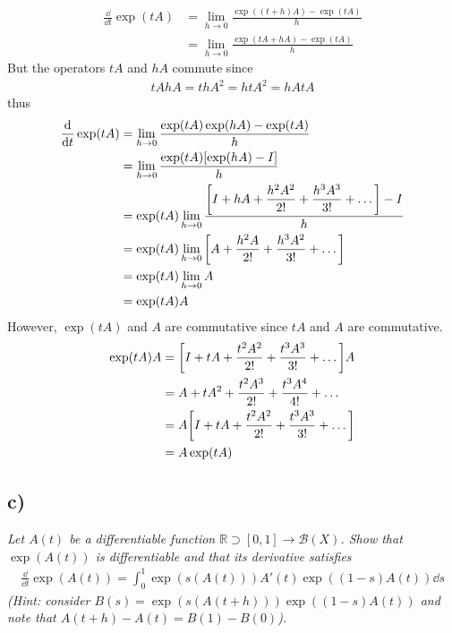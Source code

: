 \documentclass[12pt]{article}
\theoremstyle{plain}
\begin{document}
\begin{align*}
    \frac{\dd}{\dd t}\exp(tA) &= \lim_{h\rightarrow 0}\frac{\exp((t+h)A) - \exp(tA)}{h} \\
    &= \lim_{h\rightarrow 0}\frac{\exp(tA + hA) - \exp(tA)}{h}
\end{align*}
But the operators $tA$ and $hA$ commute since
\begin{align*}
    tAhA = thA^2 = htA^2 = hAtA
\end{align*}
thus
\begin{align*}
    \frac{\dd}{\dd t}\exp(tA) &= \lim_{h\rightarrow 0}\frac{\exp(tA)\exp(hA) - \exp(tA)}{h} \\
    &= \lim_{h\rightarrow 0}\frac{\exp(tA)\qty[\exp(hA) - I]}{h} \\
    &= \exp(tA)\lim_{h\rightarrow 0}\frac{\qty[I + hA + \dfrac{h^2A^2}{2!} + \dfrac{h^3A^3}{3!} + \dots] - I}{h} \\
    &= \exp(tA)\lim_{h\rightarrow 0}\qty[A + \frac{h^2A}{2!} + \frac{h^3A^2}{3!} + \dots] \\
    &= \exp(tA)\lim_{h\rightarrow 0}A \\
    &= \exp(tA)A
\end{align*}
However, $\exp(tA)$ and $A$ are commutative since $tA$ and $A$ are commutative.
\begin{align*}
    \exp(tA)A &= \qty[I + tA + \frac{t^2A^2}{2!} + \frac{t^3A^3}{3!} + \dots]A \\
    &= A + tA^2 + \frac{t^2A^3}{2!} + \frac{t^3A^4}{4!} + \dots \\
    &= A\qty[I + tA + \frac{t^2A^2}{2!} + \frac{t^3A^3}{3!} + \dots] \\
    &= A\exp(tA)
\end{align*}

\subsection*{ c)}
\emph{Let $A(t)$ be a differentiable function $\mathbb{R} \supset [0,1] \rightarrow \mathcal{B}(X)$.  Show that $\exp(A(t))$ is differentiable and that its derivative satisfies}
\begin{align*}
    \frac{\dd}{\dd t}\exp(A(t)) = \int_0^1\exp(s(A(t)))A'(t)\exp((1-s)A(t)) \dd s
\end{align*}
\emph{(Hint: consider $B(s) = \exp(s(A(t+h)))\exp((1-s)A(t))$ and note that $A(t+h) - A(t) = B(1) - B(0)$).} \\
\end{document}
